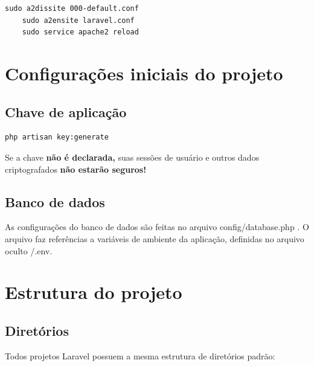 \documentclass[
12pt,				%
openany,			%
twoside,			%
a4paper,			%
english,			%
french,				%
spanish,			%
brazil,				%
]{abntex2}
\begin{document}
\begin{lstlisting}[style=bash,caption={Desabilitando virtualhost padrão e habilitando o novo}]
    sudo a2dissite 000-default.conf
    sudo a2ensite laravel.conf
    sudo service apache2 reload
\end{lstlisting}

\section{Configurações iniciais do projeto}

\subsection{Chave de aplicação}

\begin{lstlisting}[style=bash,caption={Gerando chave de aplicação}]
    php artisan key:generate
\end{lstlisting}

\begin{leftbar}
    Se a chave \textbf{não é declarada,} suas sessões de usuário e outros dados criptografados \textbf{não estarão seguros!}
\end{leftbar}

\subsection{Banco de dados}
As configurações do banco de dados são feitas no arquivo config/database.php . O
arquivo faz referências a variáveis de ambiente da aplicação, definidas no arquivo oculto /.env.

\section{Estrutura do projeto}

\subsection{Diretórios}
Todos projetos Laravel possuem a mesma estrutura de diretórios padrão:
\end{document}
